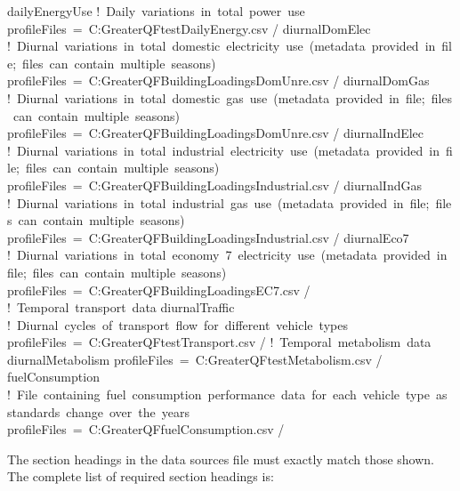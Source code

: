 \documentclass[letterpaper,10pt,english]{sphinxmanual}
\begin{document}
%
\begin{sphinxVerbatim}[commandchars=\\\{\}]
\PYGZam{}dailyEnergyUse
   ! Daily variations in total power use
   profileFiles = \PYGZsq{}C:\PYGZbs{}\PYGZbs{}GreaterQF\PYGZbs{}\PYGZbs{}testDailyEnergy.csv\PYGZsq{}
/
\PYGZam{}diurnalDomElec
   ! Diurnal variations in total domestic electricity use (metadata provided in file; files can contain multiple seasons)
   profileFiles = \PYGZsq{}\PYGZsq{}C:\PYGZbs{}\PYGZbs{}GreaterQF\PYGZbs{}\PYGZbs{}BuildingLoadings\PYGZus{}DomUnre.csv\PYGZsq{}
/
\PYGZam{}diurnalDomGas
   ! Diurnal variations in total domestic gas use (metadata provided in file; files can contain multiple seasons)
   profileFiles = \PYGZsq{}\PYGZsq{}C:\PYGZbs{}\PYGZbs{}GreaterQF\PYGZbs{}\PYGZbs{}BuildingLoadings\PYGZus{}DomUnre.csv\PYGZsq{}
/
\PYGZam{}diurnalIndElec
   ! Diurnal variations in total industrial electricity use (metadata provided in file; files can contain multiple seasons)
   profileFiles = \PYGZsq{}\PYGZsq{}C:\PYGZbs{}\PYGZbs{}GreaterQF\PYGZbs{}\PYGZbs{}BuildingLoadings\PYGZus{}Industrial.csv\PYGZsq{}
/
\PYGZam{}diurnalIndGas
   ! Diurnal variations in total industrial gas use (metadata provided in file; files can contain multiple seasons)
   profileFiles = \PYGZsq{}C:\PYGZbs{}\PYGZbs{}GreaterQF\PYGZbs{}\PYGZbs{}BuildingLoadings\PYGZus{}Industrial.csv\PYGZsq{}
/
\PYGZam{}diurnalEco7
   ! Diurnal variations in total economy 7 electricity use (metadata provided in file; files can contain multiple seasons)
   profileFiles = \PYGZsq{}C:\PYGZbs{}\PYGZbs{}GreaterQF\PYGZbs{}\PYGZbs{}BuildingLoadings\PYGZus{}EC7.csv\PYGZsq{}
/
! Temporal transport data
\PYGZam{}diurnalTraffic
   ! Diurnal cycles of transport flow for different vehicle types
   profileFiles = \PYGZsq{}C:\PYGZbs{}\PYGZbs{}GreaterQF\PYGZbs{}\PYGZbs{}testTransport.csv\PYGZsq{}
/
! Temporal metabolism data
\PYGZam{}diurnalMetabolism
   profileFiles = \PYGZsq{}C:\PYGZbs{}\PYGZbs{}GreaterQF\PYGZbs{}\PYGZbs{}testMetabolism.csv\PYGZsq{}
/
\PYGZam{}fuelConsumption
   ! File containing fuel consumption performance data for each vehicle type as standards change over the years
   profileFiles = \PYGZsq{}C:\PYGZbs{}\PYGZbs{}GreaterQF\PYGZbs{}\PYGZbs{}fuelConsumption.csv\PYGZsq{}
/
\end{sphinxVerbatim}

The section headings in the data sources file must exactly match those
shown. The complete list of required section headings is:
\end{document}
